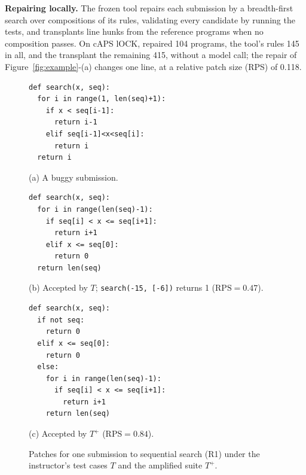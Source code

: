 \documentclass[acmsmall,screen,review,anonymous,nonacm]{acmart}
\newcommand{\RPS}{\mathrm{RPS}}
\begin{document}
\textbf{Repairing locally.} The frozen tool repairs each submission by a breadth-first search over compositions of its rules, validating every candidate by running the tests, and transplants line hunks from the reference programs when no composition passes. On cAPS lOCK,  repaired 104 programs, the tool's rules 145 in all, and the transplant the remaining 415, without a model call; the repair of Figure~\ref{fig:example}-(a) changes one line, at a relative patch size (RPS) of 0.118.

\begin{figure}[t]
\centering
\begin{minipage}[t]{0.31\textwidth}
\begin{lstlisting}
def search(x, seq):
  for i in range(1, len(seq)+1):
    if x < seq[i-1]:
      return i-1
    elif seq[i-1]<x<seq[i]:
      return i
  return i
\end{lstlisting}
\centering\footnotesize (a) A buggy submission.
\end{minipage}\hfill
\begin{minipage}[t]{0.31\textwidth}
\begin{lstlisting}
def search(x, seq):
  for i in range(len(seq)-1):
    if seq[i] < x <= seq[i+1]:
      return i+1
    elif x <= seq[0]:
      return 0
  return len(seq)
\end{lstlisting}
\centering\footnotesize (b) Accepted by $T$; \texttt{search(-15, [-6])} returns 1 ($\RPS = 0.47$).
\end{minipage}\hfill
\begin{minipage}[t]{0.33\textwidth}
\begin{lstlisting}
def search(x, seq):
  if not seq:
    return 0
  elif x <= seq[0]:
    return 0
  else:
    for i in range(len(seq)-1):
      if seq[i] < x <= seq[i+1]:
        return i+1
    return len(seq)
\end{lstlisting}
\centering\footnotesize (c) Accepted by $T^{+}$ ($\RPS = 0.84$).
\end{minipage}
\caption{Patches for one submission to sequential search (R1) under the instructor's test cases $T$ and the amplified suite $T^{+}$.}
\label{fig:thin}
\end{figure}
\end{document}
